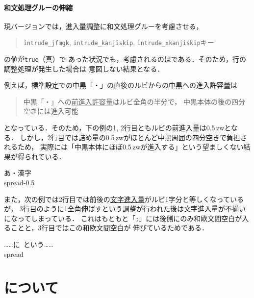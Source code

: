 \documentclass[a4paper,10ptj]{ltjsarticle}
\def\emph#1{\textbf{\textgt{#1}}}
\begin{document}
\paragraph{和文処理グルーの伸縮}
現バージョンでは，進入量調整に和文処理グルーを考慮させる，
\begin{quote}
\texttt{intrude\_jfmgk}, \texttt{intrude\_kanjiskip}, \texttt{intrude\_xkanjiskip}キー
\end{quote}
の値が\texttt{true}（真）で
あった状況でも，考慮されるのは\emph{自然長の値のみ}である．そのため，行の調整処理が発生した場合は
意図しない結果となる．

例えば，標準設定での中黒「・」の直後のルビからの中黒への進入許容量は
\begin{quote}
  中黒「・」への\underline{前進入許容量}はルビ全角の半分で，
  中黒本体の後の四分空きには進入可能
\end{quote}
となっている．そのため，下の例の1, 2行目ともルビの前進入量は0.5\,zwとなる．
しかし，2行目では詰め量の0.5\,zwがほとんど中黒周囲の四分空きで負担されるため，
実際には「中黒本体にほぼ0.5\,zwが進入する」という望ましくない結果が得られている．
\begin{LTXexample}[preset=\Large,width=0.4\textwidth]
\leavevmode\hbox{あ・漢字}\\
\hbox spread-0.5
\end{LTXexample}

また，次の例では2行目では前後の\underline{文字進入量}がルビ1字分と等しくなっているが，
3行目のように1全角伸ばすという調整が行われた後は\underline{文字進入量}が不揃いになってしまっている．
これはもともと「\texttt{;}」には後側にのみ和欧文間空白が入ることと，3行目ではこの和欧文間空白が
伸びているためである．
\begin{LTXexample}[preset=\Large,width=0.4\textwidth]
\leavevmode\hbox{……に%
  という……}\\
\hbox spread
\end{LTXexample}

\newpage
\section{について}
\end{document}
